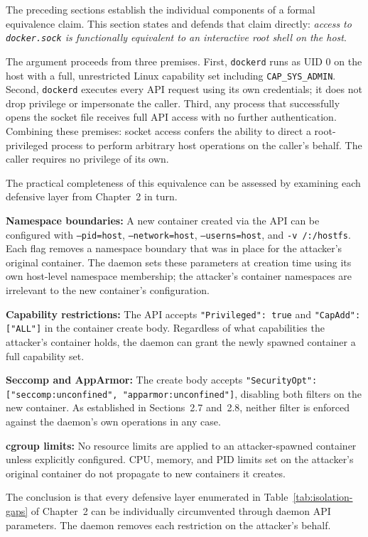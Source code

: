 The preceding sections establish the individual components of a formal equivalence
claim. This section states and defends that claim directly: \textit{access to
\texttt{docker.sock} is functionally equivalent to an interactive root shell on the
host}.

The argument proceeds from three premises. First, \texttt{dockerd} runs as UID 0 on
the host with a full, unrestricted Linux capability set including
\texttt{CAP\_SYS\_ADMIN}. Second, \texttt{dockerd} executes every API request using
its own credentials; it does not drop privilege or impersonate the caller. Third, any
process that successfully opens the socket file receives full API access with no
further authentication. Combining these premises: socket access confers the ability
to direct a root-privileged process to perform arbitrary host operations on the
caller's behalf. The caller requires no privilege of its own.

The practical completeness of this equivalence can be assessed by examining each
defensive layer from Chapter~2 in turn.

\textbf{Namespace boundaries:} A new container created via the API can be configured
with \texttt{--pid=host}, \texttt{--network=host}, \texttt{--userns=host}, and
\texttt{-v /:/hostfs}. Each flag removes a namespace boundary that was in place for
the attacker's original container. The daemon sets these parameters at creation time
using its own host-level namespace membership; the attacker's container namespaces
are irrelevant to the new container's configuration.

\textbf{Capability restrictions:} The API accepts \texttt{"Privileged": true} and
\texttt{"CapAdd": ["ALL"]} in the container create body. Regardless of what
capabilities the attacker's container holds, the daemon can grant the newly spawned
container a full capability set.

\textbf{Seccomp and AppArmor:} The create body accepts
\texttt{"SecurityOpt": ["seccomp:unconfined", "apparmor:unconfined"]}, disabling both
filters on the new container. As established in Sections~2.7 and~2.8, neither filter
is enforced against the daemon's own operations in any case.

\textbf{cgroup limits:} No resource limits are applied to an attacker-spawned
container unless explicitly configured. CPU, memory, and PID limits set on the
attacker's original container do not propagate to new containers it creates.

The conclusion is that every defensive layer enumerated in Table~\ref{tab:isolation-gaps}
of Chapter~2 can be individually circumvented through daemon API parameters. The
daemon removes each restriction on the attacker's behalf.

